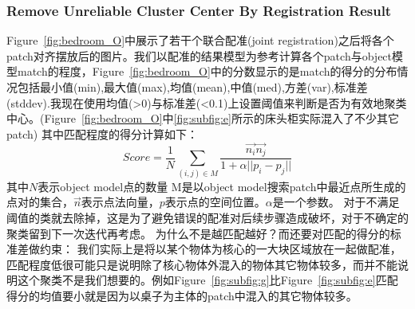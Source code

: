 \subsubsection{Remove Unreliable Cluster Center By Registration Result}
Figure~\ref{fig:bedroom_O}中展示了若干个联合配准(joint registration)之后将各个patch对齐摆放后的图片。我们以配准的结果模型为参考计算各个patch与object模型match的程度，Figure~\ref{fig:bedroom_O}中的分数显示的是match的得分的分布情况包括最小值(min),最大值(max),均值(mean),中值(med),方差(var),标准差(stddev).我现在使用均值(>0)与标准差(<0.1)上设置阈值来判断是否为有效地聚类中心。(Figure~\ref{fig:bedroom_O}中\ref{fig:subfig:e}所示的床头柜实际混入了不少其它patch)
其中匹配程度的得分计算如下：
$$Score=\frac{1}{N}\sum_{(i,j)\in M }\frac{\vec{n_i}\vec{n_j}}{1+\alpha||p_i-p_j||} $$
其中$N$表示object model点的数量 M是以object model搜索patch中最近点所生成的点对的集合，$\vec{n}$表示点法向量，$p$表示点的空间位置。$\alpha$是一个参数。
对于不满足阈值的类就去除掉，这是为了避免错误的配准对后续步骤造成破坏，对于不确定的聚类留到下一次迭代再考虑。
为什么不是越匹配越好？而还要对匹配的得分的标准差做约束：
我们实际上是将以某个物体为核心的一大块区域放在一起做配准，匹配程度低很可能只是说明除了核心物体外混入的物体其它物体较多，而并不能说明这个聚类不是我们想要的。例如Figure~\ref{fig:subfig:g}比Figure~\ref{fig:subfig:e}匹配得分的均值要小就是因为以桌子为主体的patch中混入的其它物体较多。
